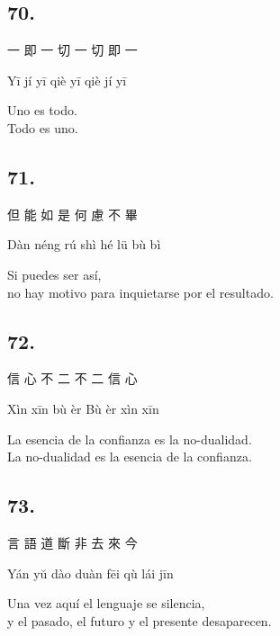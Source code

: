 \documentclass[
  a5paperpaper,
]{article}
\begin{document}
\begin{verseblock}

\hypertarget{section-144}{%
\subsection{70.}\label{section-144}}

一 即 一 切 一 切 即 一

Yī jí yī qiè yī qiè jí yī

Uno es todo.\\
Todo es uno.

\end{verseblock}

\begin{verseblock}

\hypertarget{section-145}{%
\subsection{71.}\label{section-145}}

但 能 如 是 何 慮 不 畢

Dàn néng rú shì hé lü bù bì

Si puedes ser así,\\
no hay motivo para inquietarse por el resultado.

\end{verseblock}

\begin{verseblock}

\hypertarget{section-146}{%
\subsection{72.}\label{section-146}}

信 心 不 二 不 二 信 心

Xìn xīn bù èr Bù èr xìn xīn

La esencia de la confianza es la no-dualidad.\\
La no-dualidad es la esencia de la confianza.

\end{verseblock}

\begin{verseblock}

\hypertarget{section-147}{%
\subsection{73.}\label{section-147}}

言 語 道 斷 非 去 來 今

Yán yŭ dào duàn fēi qù lái jīn

Una vez aquí el lenguaje se silencia,\\
y el pasado, el futuro y el presente desaparecen.

\end{verseblock}
\end{document}
